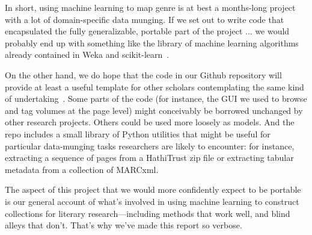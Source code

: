 \documentclass[paper=a4, fontsize=12pt]{scrartcl}
\numberwithin{equation}{section}		%
\numberwithin{figure}{section}			%
\numberwithin{table}{section}				%
\begin{document}
In short, using machine learning to map genre is at best a months-long project with a lot of domain-specific data munging. If we set out to write code that encapsulated the fully generalizable, portable part of the project ... we would probably end up with something like the library of machine learning algorithms already contained in Weka and scikit-learn~\cite{weka, scikit-learn}. 

On the other hand, we do hope that the code in our Github repository will provide at least a useful template for other scholars contemplating the same kind of undertaking~\cite{underwood:genrerepo}. Some parts of the code (for instance, the GUI we used to browse and tag volumes at the page level) might conceivably be borrowed unchanged by other research projects. Others could be used more loosely as models. And the repo includes a small library of Python utilities that might be useful for particular data-munging tasks researchers are likely to encounter: for instance, extracting a sequence of pages from a HathiTrust zip file or extracting tabular metadata from a collection of MARCxml.

The aspect of this project that we would more confidently expect to be portable is our general account of what's involved in using machine learning to construct collections for literary research---including methods that work well, and blind alleys that don't. That's why we've made this report so verbose.

\newpage



\end{document}
